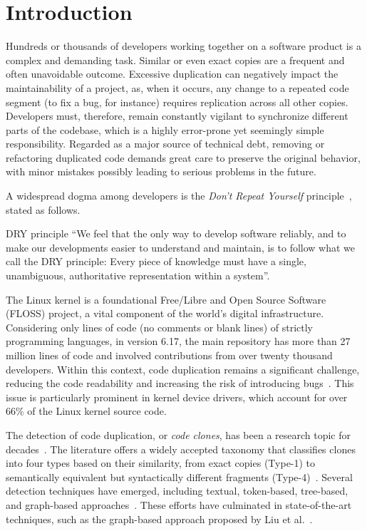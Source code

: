 \documentclass[10pt,conference]{IEEEtran}
\newenvironment{dry-highlight-box}[1]{%
  \begin{tcolorbox}[colback=blue!5!white, colframe=blue!60!black, boxrule=0.5pt,
                    left=1mm, right=1mm, top=1mm, bottom=1mm, sharp corners]
  \textbf{#1:} \itshape}{\end{tcolorbox}}
\begin{document}

\IEEEpeerreviewmaketitle

\section{Introduction}
\label{sec:introduction}

Hundreds or thousands of developers working together on a software product is a complex and demanding task. Similar or even exact copies are a frequent and often unavoidable outcome. Excessive duplication can negatively impact the maintainability of a project, as, when it occurs, any change to a repeated code segment (to fix a bug, for instance) requires replication across all other copies. Developers must, therefore, remain constantly vigilant to synchronize different parts of the codebase, which is a highly error-prone yet seemingly simple responsibility. Regarded as a major source of technical debt, removing or refactoring duplicated code demands great care to preserve the original behavior, with minor mistakes possibly leading to serious problems in the future.

A widespread dogma among developers is the \textit{Don't Repeat Yourself} principle~\cite{pragmatic-programmer}, stated as follows.

\begin{dry-highlight-box}{DRY principle}
  ``We feel that the only way to develop software reliably, and to make our
  developments easier to understand and maintain, is to follow what we call the
  DRY principle: Every piece of knowledge must have a single, unambiguous,
  authoritative representation within a system''.
\end{dry-highlight-box}

The Linux kernel is a foundational Free/Libre and Open Source Software (FLOSS) project, a vital component of the world's digital infrastructure. Considering only lines of code (no comments or blank lines) of strictly programming languages, in version 6.17, the main repository has more than 27 million lines of code and involved contributions from over twenty thousand developers. Within this context, code duplication remains a significant challenge,  reducing the code readability and increasing the risk of introducing bugs~\cite{harmone,harmtwo}. This issue is particularly prominent in kernel device drivers, which account for over 66\% of the Linux kernel source code.

The detection of code duplication, or \textit{code clones}, has been a research topic for decades~\cite{firstman}. The literature offers a widely accepted taxonomy that classifies clones into four types based on their similarity, from exact copies (Type-1) to semantically equivalent but syntactically different fragments (Type-4)~\cite{litreview}. Several detection techniques have emerged, including textual, token-based, tree-based, and graph-based approaches~\cite{litreview}. These efforts have culminated in state-of-the-art techniques, such as the graph-based approach proposed by Liu et al.~\cite{tailor}.
\end{document}
